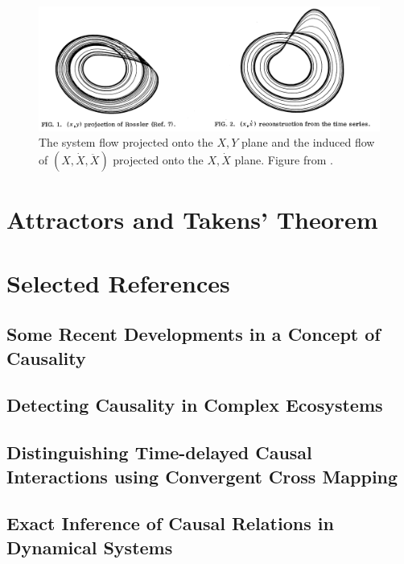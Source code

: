 \documentclass[10pt]{article}
\theoremstyle{definition}
\theoremstyle{remark}
\begin{document}
\begin{figure}[H]
    \centering
    \includegraphics[scale=0.25]{figures/rossler_reconstruction.png}
    \caption{The \citeauthor{rossler1976equation} system flow projected onto the $X, Y$ plane and the induced flow of $(X, \dot X, \ddot X)$ projected onto the $X, \dot X$ plane. Figure from \parencite{packard1980geometry}.}
\end{figure}

\section{Attractors and Takens' Theorem}

\section{Selected References}

\subsection{Some Recent Developments in a Concept of Causality}

\citeauthor{granger1988some}

\subsection{Detecting Causality in Complex Ecosystems}

\citeauthor{sugihara2012detecting}

\subsection{Distinguishing Time-delayed Causal Interactions using Convergent Cross Mapping}

\citeauthor{ye2015distinguishing}

\subsection{Exact Inference of Causal Relations in Dynamical Systems}

\citeauthor{benkHo2018exact}

\clearpage
\nocite{*}
\printbibliography
\end{document}

